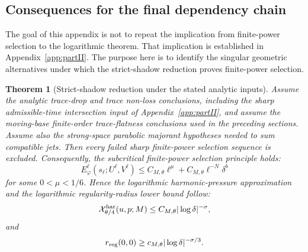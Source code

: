 \documentclass[11pt]{article}
\numberwithin{equation}{section}
\theoremstyle{plain}
\newtheorem{theorem}{Theorem}[section]
\theoremstyle{definition}
\theoremstyle{remark}
\newcommand{\calX}{\mathcal X}
\begin{document}
\subsection{Consequences for the final dependency chain}\label{pIII:sec:consequences}

The goal of this appendix is not to repeat the implication from finite-power selection to the logarithmic
theorem.  That implication is established in Appendix~\ref{app:partII}.  The purpose here is to identify the singular
geometric alternatives under which the strict-shadow reduction proves finite-power selection.

\begin{theorem}[Strict-shadow reduction under the stated analytic inputs]
\label{pIII:thm:strict-shadow-all-branches-closure}
Assume the analytic trace-drop and trace non-loss conclusions, including the sharp admissible-time intersection input of Appendix~\ref{app:partII}, and assume the moving-base finite-order trace-flatness conclusions used in the preceding sections.  Assume also the strong-space parabolic
majorant hypotheses needed to sum compatible jets.  Then every failed sharp finite-power selection
sequence is excluded.  Consequently, the subcritical finite-power selection principle holds:
\[
        E^\ell_\varphi(s_\ell;U^\ell,V^\ell)
        \le
        C_{M,\theta}\ell^\mu
        +
        C_{M,\theta}\ell^{-N}\delta^b
\]
for some \(0<\mu<1/6\).  Hence the logarithmic harmonic-pressure approximation and the
logarithmic regularity-radius lower bound follow:
\[
        \calX^{\rm har}_{\theta/4}(u,p;M)
        \le
        C_{M,\theta}|\log\delta|^{-\sigma},
\]
and
\[
        r_{\rm reg}(0,0)
        \ge
        c_{M,\theta}|\log\delta|^{-\sigma/3}.
\]
\end{theorem}
\end{document}
